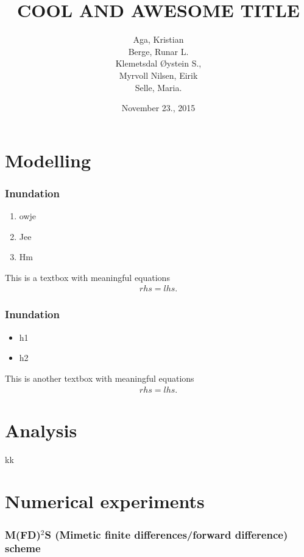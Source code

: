 \documentclass[screen]{beamer}
\title[Eksempelforedrag]%
{COOL AND AWESOME TITLE}
\author[aut]{Aga, Kristian \\ Berge, Runar L. \\ Klemetsdal Øystein S.,\\
	Myrvoll Nilsen, Eirik \\ Selle, Maria.
}
\date{November 23., 2015}
\begin{document}
\ntnutitlepage

\section*{Modelling}
\begin{frame}
    \frametitle[jaddA]{Inundation}
    \begin{enumerate}[\label = $\circ$]
        \item    owje
        \item    Jee
        \item    Hm
    \end{enumerate}
    \begin{block}{This is a textbox with meaningful equations}
        \begin{align*}
            rhs = lhs.
        \end{align*}
    \end{block}
\end{frame}

\begin{frame}
    \frametitle{Inundation}
    \begin{itemize}
        \pause
        \item    h1
        \pause
        \item    h2    
    \end{itemize}
    \pause
    \begin{block}{This is another textbox with meaningful equations}
        \begin{align*}
            rhs = lhs.
        \end{align*}
    \end{block}
\end{frame}

\section*{Analysis}
\begin{frame}
    kk
\end{frame}

\section*{Numerical experiments}

\begin{frame}
    \frametitle{M(FD)$^2$S (Mimetic finite differences/forward difference) scheme}
    \pause
    
\end{frame}
\end{document}
